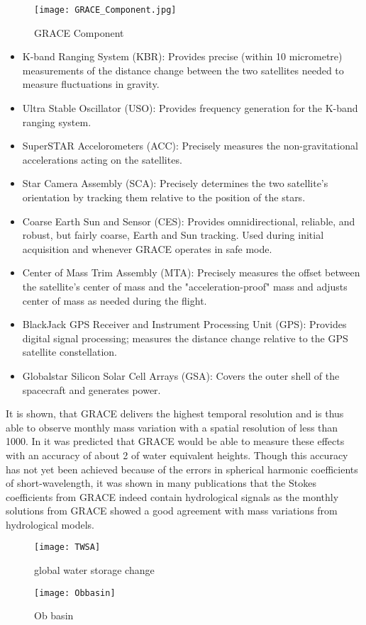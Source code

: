 \begin{figure}[htbp]
	\centering
	\texttt{[image: GRACE\_Component.jpg]} 
	\caption{GRACE Component} 
	\label{fig:GRACEComponent}
\end{figure}
\begin{itemize}
	\item K-band Ranging System (KBR): Provides precise (within 10 micrometre) measurements of the distance change between the two satellites needed to measure fluctuations in gravity.
	\item Ultra Stable Oscillator (USO): Provides frequency generation for the K-band ranging system.
	\item SuperSTAR Accelorometers (ACC): Precisely measures the non-gravitational accelerations acting on the satellites.
	\item Star Camera Assembly (SCA): Precisely determines the two satellite's orientation by tracking them relative to the position of the stars.
	\item Coarse Earth Sun and Sensor (CES): Provides omnidirectional, reliable, and robust, but fairly coarse, Earth and Sun tracking. Used during initial acquisition and whenever GRACE operates in safe mode.
	\item Center of Mass Trim Assembly (MTA): Precisely measures the offset between the satellite's center of mass and the "acceleration-proof" mass and adjusts center of mass as needed during the flight.
	\item BlackJack GPS Receiver and Instrument Processing Unit (GPS): 	Provides digital signal processing; measures the distance change relative to the GPS satellite constellation.
	\item Globalstar Silicon Solar Cell Arrays (GSA): Covers the outer shell of the spacecraft and generates power.
\end{itemize}
It is shown, that GRACE delivers the highest temporal resolution and is thus able to observe monthly mass variation with a spatial resolution of less than 1000. In \cite{wahr1998time} it was predicted that GRACE would be able to measure these effects with an accuracy of about 2 of water equivalent heights. Though this accuracy has not yet been achieved because of the errors in spherical harmonic coefficients of short-wavelength, it was shown in many publications that the Stokes coefficients from GRACE indeed contain hydrological signals as the monthly solutions from GRACE showed a good agreement with mass variations from hydrological models.
\begin{figure}[htbp]
	\centering
	\texttt{[image: TWSA]} %
	\caption{global water storage change} 
	\label{fig:TWSA}
\end{figure}
\begin{figure}[ht]
	\centering
	\texttt{[image: Obbasin]} %
	\caption{Ob basin} 
	\label{fig:Obbasin}
\end{figure}
